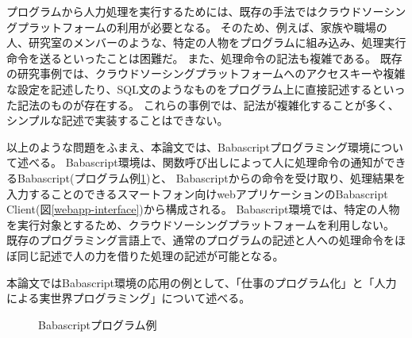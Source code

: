 \documentclass[twoside]{wiss}
\begin{document}
プログラムから人力処理を実行するためには、既存の手法ではクラウドソーシングプラットフォームの利用が必要となる。
そのため、例えば、家族や職場の人、研究室のメンバーのような、特定の人物をプログラムに組み込み、処理実行命令を送るといったことは困難だ。
また、処理命令の記法も複雑である。
既存の研究事例では、クラウドソーシングプラットフォームへのアクセスキーや複雑な設定を記述したり、SQL文のようなものをプログラム上に直接記述するといった記法のものが存在する。
これらの事例では、記法が複雑化することが多く、シンプルな記述で実装することはできない。

以上のような問題をふまえ、本論文では、Babascriptプログラミング環境について述べる。
Babascript環境は、関数呼び出しによって人に処理命令の通知ができるBabascript(プログラム例\ref{script_01})と、
Babascriptからの命令を受け取り、処理結果を入力することのできるスマートフォン向けwebアプリケーションのBabascript Client(図\ref{webapp-interface})から構成される。
Babascript環境では、特定の人物を実行対象とするため、クラウドソーシングプラットフォームを利用しない。
既存のプログラミング言語上で、通常のプログラムの記述と人への処理命令をほぼ同じ記述で人の力を借りた処理の記述が可能となる。

本論文ではBabascript環境の応用の例として、「仕事のプログラム化」と「人力による実世界プログラミング」について述べる。


\begin{figure}[!h]  
  \centering
  \caption{Babascriptプログラム例}
  \label{script_01}
\end{figure}
\end{document}
